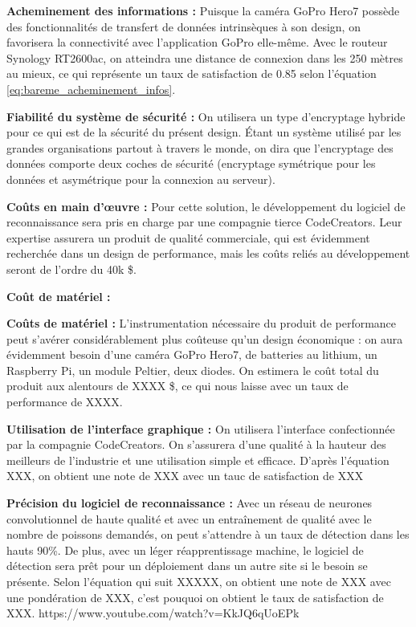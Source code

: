 \textbf{Acheminement des informations :}
Puisque la caméra GoPro Hero7 possède des fonctionnalités de transfert de données intrinsèques à son design, on favorisera la connectivité avec l’application GoPro elle-même. Avec le routeur Synology RT2600ac, on atteindra une distance de connexion dans les 250 mètres au mieux, ce qui représente un taux de satisfaction de 0.85 selon l'équation \ref{eq:bareme_acheminement_infos}.

\textbf{Fiabilité du système de sécurité :}
On utilisera un type d’encryptage hybride pour ce qui est de la sécurité du présent design. Étant un système utilisé par les grandes organisations partout à travers le monde, on dira que l’encryptage des données comporte deux coches de sécurité (encryptage symétrique pour les données et asymétrique pour la connexion au serveur). 

\textbf{Coûts en main d’œuvre :}
Pour cette solution, le développement du logiciel de reconnaissance sera pris en charge par une compagnie tierce CodeCreators. Leur expertise assurera un produit de qualité commerciale, qui est évidemment recherchée dans un design de performance, mais les coûts reliés au développement seront de l’ordre du 40k \$.

\textbf{Coût de matériel : }


\textbf{Coûts de matériel :}
L’instrumentation nécessaire du produit de performance peut s’avérer considérablement plus coûteuse qu'un design économique : on aura évidemment besoin d’une caméra GoPro Hero7, de batteries au lithium, un Raspberry Pi, un module Peltier, deux diodes. On estimera le coût total du produit aux alentours de XXXX \$, ce qui nous laisse avec un taux de performance de XXXX. 


\textbf{Utilisation de l’interface graphique :}
On utilisera l’interface confectionnée par la compagnie CodeCreators. On s’assurera d’une qualité à la hauteur des meilleurs de l’industrie et une utilisation simple et efficace. D’après l’équation XXX, on obtient une note de XXX avec un tauc de satisfaction de XXX%

\textbf{Précision du logiciel de reconnaissance :}
Avec un réseau de neurones convolutionnel de haute qualité et avec un entraînement de qualité avec le nombre de poissons demandés, on peut s’attendre à un taux de détection dans les hauts 90\%. De plus, avec un léger réapprentissage machine, le logiciel de détection sera prêt pour un déploiement dans un autre site si le besoin se présente. Selon l’équation qui suit XXXXX, on obtient une note de XXX avec une pondération de XXX, c’est pouquoi on obtient le taux de satisfaction de XXX. https://www.youtube.com/watch?v=KkJQ6qUoEPk


